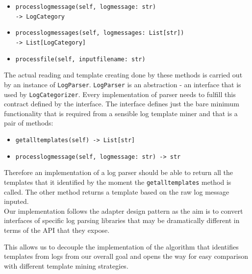 \begin{itemize}
    \item \texttt{process\textunderscore log\textunderscore message(self, log\textunderscore message: str)\\ -> LogCategory}
    \item \texttt{process\textunderscore log\textunderscore messages(self, log\textunderscore messages: List[str])\\ -> List[LogCategory]}
    \item \texttt{process\textunderscore file(self, input\textunderscore file\textunderscore name: str)}
\end{itemize}

The actual reading and template creating done by these methods is carried out by an instance of \texttt{LogParser}. \texttt{LogParser} is an abstraction - an interface that is used by \texttt{LogCategorizer}. Every implementation of parser needs to fulfill this contract defined by the interface. The interface defines just the bare minimum functionality that is required from a sensible log template miner and that is a pair of methods:
\begin{itemize}
    \item \texttt{get\textunderscore all\textunderscore templates(self) -> List[str]}
    \item \texttt{process\textunderscore log\textunderscore message(self, log\textunderscore message: str) -> str}
\end{itemize}
Therefore an implementation of a log parser should be able to return all the templates that it identified by the moment the \texttt{get\textunderscore all\textunderscore templates} method is called. The other method returns a template based on the raw log message inputed.\\

Our implementation follows the adapter design pattern \cite{gamma1995design_pattern_adapter} as the aim is to convert interfaces of specific log parsing libraries that may be dramatically different in terms of the API that they expose.

This allows us to decouple the implementation of the algorithm that identifies templates from logs from our overall goal and opens the way for easy comparison with different template mining strategies.\\

